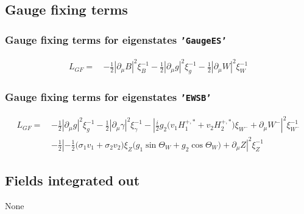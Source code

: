 \subsection{Gauge fixing terms} 
\subsubsection{Gauge fixing terms for eigenstates {\tt 'GaugeES'} } 
\begin{align} 
L_{GF} = \, &-\frac{1}{2} |\partial_{\mu}B|^2 \xi_{B}^{-1}  -\frac{1}{2} |\partial_{\mu}g|^2 \xi_{g}^{-1}  -\frac{1}{2} |\partial_{\mu}W|^2 \xi_{W}^{-1} 
\end{align} 
\subsubsection{Gauge fixing terms for eigenstates {\tt 'EWSB'} } 
\begin{align} 
L_{GF} = \, &-\frac{1}{2} |\partial_{\mu}g|^2 \xi_{g}^{-1} -\frac{1}{2} |\partial_{\mu}\gamma|^2 \xi_{\gamma}^{-1} - |\frac{i}{2} g_2 \Big(v_1 H_1^{+,*}  + v_2 H_2^{+,*} \Big)\xi_{W^-}  + \partial_{\mu}W^-|^2 \xi_{W^-}^{-1} \nonumber \\ 
 &-\frac{1}{2} |-\frac{1}{2} \Big(\sigma_1 v_1  + \sigma_2 v_2 \Big)\xi_{Z} \Big(g_1 \sin\Theta_W   + g_2 \cos\Theta_W  \Big) + \partial_{\mu}Z|^2 \xi_{Z}^{-1} 
\end{align} 
\subsection{Fields integrated out} 
None 
